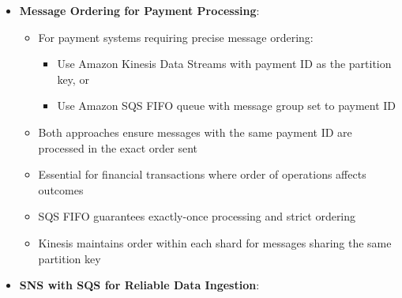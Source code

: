 \documentclass[11pt,a4paper]{report}
\begin{document}
\begin{itemize}
\begin{itemize}
  \item For serverless image processing with automatic scaling:
\begin{itemize}
  \item Configure S3 bucket to send notifications to SQS queue on image uploads
  \item Use Lambda function with SQS queue as invocation source
  \item Process messages from queue and delete successfully processed messages
\end{itemize}
  \item Creates a durable, stateless system that ensures processing requests aren't lost
  \item Enables the system to automatically scale to handle varying loads
  \item Removes direct dependencies between components
  \item Provides a more resilient solution than direct Lambda triggers from S3
  \item Eliminates need for tracking processed files in memory which introduces statefulness
  \item More efficient than using EC2 instances to monitor queues or manual processing steps
\end{itemize}
  \item \textbf{Message Ordering for Payment Processing}:
\begin{itemize}
  \item For payment systems requiring precise message ordering:
\begin{itemize}
  \item Use Amazon Kinesis Data Streams with payment ID as the partition key, or
  \item Use Amazon SQS FIFO queue with message group set to payment ID
\end{itemize}
  \item Both approaches ensure messages with the same payment ID are processed in the exact order sent
  \item Essential for financial transactions where order of operations affects outcomes
  \item SQS FIFO guarantees exactly-once processing and strict ordering
  \item Kinesis maintains order within each shard for messages sharing the same partition key
\end{itemize}
  \item \textbf{SNS with SQS for Reliable Data Ingestion}:

\end{itemize}
\end{document}
